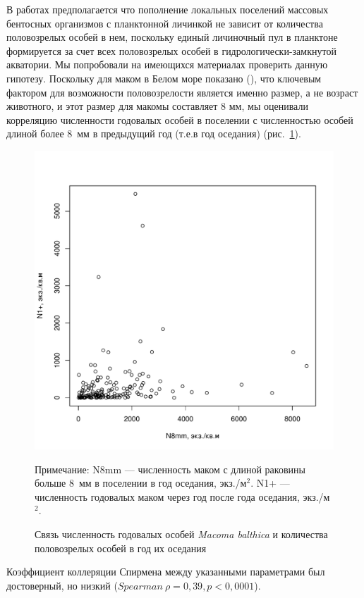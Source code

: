 В работах \cite{} предполагается что пополнение локальных поселений массовых бентосных организмов с планктонной личинкой не зависит от количества половозрелых особей в нем, поскольку единый личиночный пул в планктоне формируется за счет всех половозрелых особей в гидрологически-замкнутой акватории.
Мы попробовали на имеющихся материалах проверить данную гипотезу.
Поскольку для маком в Белом море показано (\cite{Semenova_1980, Maximovich_1985}), что ключевым фактором для возможности половозрелости является именно размер, а не возраст животного, и этот размер для макомы составляет 8 мм, мы оценивали корреляцию численности годовалых особей в поселении с численностью особей длиной более $8$~мм в предыдущий год (т.е.в год оседания) (рис.~\ref{ris:N1year_vs_N8mm}).
    \begin{figure}[hbp]
        \includegraphics[width=\textwidth]{../White_Sea/oneyear_all_Kandalaksha_all/N8mm_vs_N1y_1.pdf}
    \caption{Связь численность годовалых особей {\it Macoma balthica} и количества половозрелых особей в год их оседания}
    \label{ris:N1year_vs_N8mm}

	\footnotesize{Примечание: N8mm --- численность маком с длиной раковины больше $8$~мм в поселении  в год оседания, экз./м$^2$. N1+ ---численность годовалых маком через год после года оседания, экз./м$^2$.}
    \end{figure}
Коэффициент коллеряции Спирмена между указанными параметрами был достоверный, но низкий ($Spearman\ \rho = 0,39, p < 0,0001$). 

